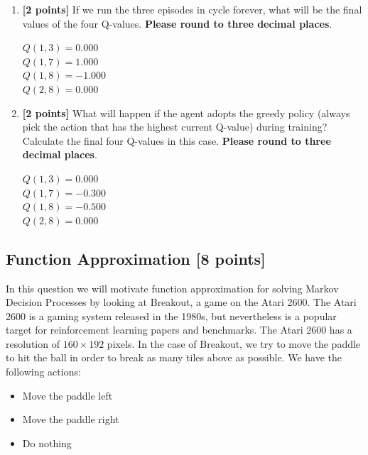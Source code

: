 \documentclass[11pt]{article}
\numberwithin{equation}{section} %
\numberwithin{figure}{section} %
\numberwithin{table}{section} %
\newcommand{\points}[1]{{\bf [#1 points]}}
\begin{document}
\begin{enumerate}
\item \textbf{[2 points]} If we run the three episodes in cycle forever, what will be the final values of the four Q-values.  \textbf{Please round to three decimal places}.

\begin{tcolorbox}[fit,height=3cm, width=\linewidth, blank, borderline={1pt}{-2pt},nobeforeafter]
    $Q(1,3) = 0.000$\\
    $Q(1,7) = 1.000$\\
    $Q(1,8) = -1.000$\\
    $Q(2,8) = 0.000$
\end{tcolorbox}


\clearpage
\item \textbf{[2 points]} What will happen if the agent adopts the greedy policy (always pick the action that has the highest current Q-value) during training? Calculate the final four Q-values in this case. \textbf{Please round to three decimal places}.

\begin{tcolorbox}[fit,height=3cm, width=\linewidth, blank, borderline={1pt}{-2pt},nobeforeafter]
    $Q(1,3) = 0.000$\\
    $Q(1,7) = -0.300$\\
    $Q(1,8) = -0.500$\\
    $Q(2,8) = 0.000$
\end{tcolorbox}


\end{enumerate}

\clearpage

\subsection{Function Approximation \points{8}}
\label{sec:FA}
In this question we will motivate function approximation for solving Markov Decision Processes by looking at Breakout, a game on the Atari 2600. The Atari 2600 is a gaming system released in the 1980s, but nevertheless is a popular target for reinforcement learning papers and benchmarks. The Atari 2600 has a resolution of $160 \times 192$ pixels. In the case of Breakout, we try to move the paddle to hit the ball in order to break as many tiles above as possible. We have the following actions:
\begin{itemize}
    \item Move the paddle left
    \item Move the paddle right
    \item Do nothing
\end{itemize}
\end{document}
